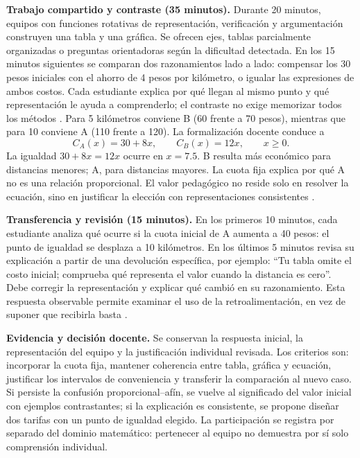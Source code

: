 \documentclass[spanish,letterpaper,oneside]{article}
\begin{document}
\textbf{Trabajo compartido y contraste (35 minutos).} Durante 20 minutos, equipos con funciones rotativas de representación, verificación y argumentación construyen una tabla y una gráfica. Se ofrecen ejes, tablas parcialmente organizadas o preguntas orientadoras según la dificultad detectada. En los 15 minutos siguientes se comparan dos razonamientos lado a lado: compensar los 30 pesos iniciales con el ahorro de 4 pesos por kilómetro, o igualar las expresiones de ambos costos. Cada estudiante explica por qué llegan al mismo punto y qué representación le ayuda a comprenderlo; el contraste no exige memorizar todos los métodos \citep[pp.~27, 34]{star2015algebra}. Para 5 kilómetros conviene B (60 frente a 70 pesos), mientras que para 10 conviene A (110 frente a 120). La formalización docente conduce a
\[
  C_A(x)=30+8x,\qquad C_B(x)=12x,\qquad x\geq 0.
\]
La igualdad \(30+8x=12x\) ocurre en \(x=7.5\). B resulta más económico para distancias menores; A, para distancias mayores. La cuota fija explica por qué A no es una relación proporcional. El valor pedagógico no reside solo en resolver la ecuación, sino en justificar la elección con representaciones consistentes \citep{sawyer2008optimizing}.

\textbf{Transferencia y revisión (15 minutos).} En los primeros 10 minutos, cada estudiante analiza qué ocurre si la cuota inicial de A aumenta a 40 pesos: el punto de igualdad se desplaza a 10 kilómetros. En los últimos 5 minutos revisa su explicación a partir de una devolución específica, por ejemplo: ``Tu tabla omite el costo inicial; comprueba qué representa el valor cuando la distancia es cero''. Debe corregir la representación y explicar qué cambió en su razonamiento. Esta respuesta observable permite examinar el uso de la retroalimentación, en vez de suponer que recibirla basta \citep{eef2021feedback,wisniewski2020feedback}.

\textbf{Evidencia y decisión docente.} Se conservan la respuesta inicial, la representación del equipo y la justificación individual revisada. Los criterios son: incorporar la cuota fija, mantener coherencia entre tabla, gráfica y ecuación, justificar los intervalos de conveniencia y transferir la comparación al nuevo caso. Si persiste la confusión proporcional--afín, se vuelve al significado del valor inicial con ejemplos contrastantes; si la explicación es consistente, se propone diseñar dos tarifas con un punto de igualdad elegido. La participación se registra por separado del dominio matemático: pertenecer al equipo no demuestra por sí solo comprensión individual.
\end{document}
